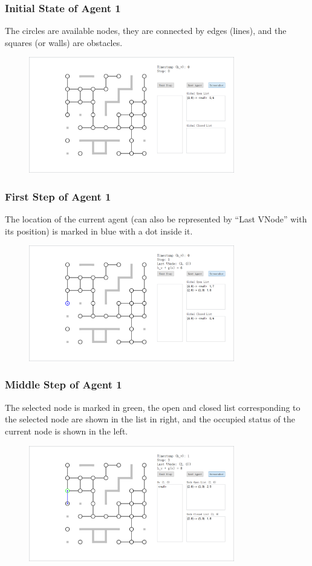 \documentclass{beamer}
\begin{document}
\begin{frame}
\frametitle{Initial State of Agent 1}
The circles are available nodes, they are connected by edges (lines), and the squares (or walls) are obstacles.
\begin{figure}
\centering
\includegraphics[width=0.8\textwidth]{a1s0.png}
\end{figure}
\end{frame}

\begin{frame}
\frametitle{First Step of Agent 1}
The location of the current agent (can also be represented by ``Last VNode'' with its position) is marked in blue with a dot inside it. 
\begin{figure}
\centering
\includegraphics[width=0.8\textwidth]{a1s1.png}
\end{figure}
\end{frame}

\begin{frame}
\frametitle{Middle Step of Agent 1}
The selected node is marked in green, the open and closed list corresponding to the selected node are shown in the list in right, and the occupied status of the current node is shown in the left.
\begin{figure}
\centering
\includegraphics[width=0.8\textwidth]{a1s2.png}
\end{figure}
\end{frame}
\end{document}
